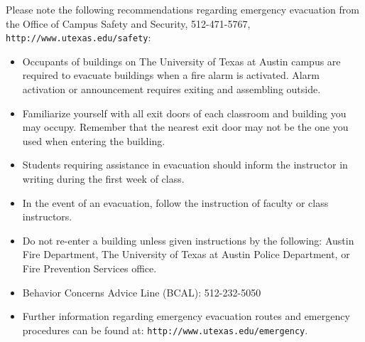 \documentclass[11pt]{article}
\begin{document}
Please note the following recommendations regarding emergency evacuation from the Office of Campus Safety and Security, 512-471-5767, \texttt{http://www.utexas.edu/safety}:
\begin{itemize}
\item Occupants of buildings on The University of Texas at Austin campus are required to evacuate buildings when a fire alarm is activated.  Alarm activation or announcement requires exiting and assembling outside.
\item Familiarize yourself with all exit doors of each classroom and building you may occupy.  Remember that the nearest exit door may not be the one you used when entering the building.
\item Students requiring assistance in evacuation should inform the instructor in writing during the first week of class.
\item In the event of an evacuation, follow the instruction of faculty or class instructors.
\item Do not re-enter a building unless given instructions by the following: Austin Fire Department, The University of Texas at Austin Police Department, or Fire Prevention Services office.
\item Behavior Concerns Advice Line (BCAL):  512-232-5050
\item Further information regarding emergency evacuation routes and emergency procedures can be found at: \texttt{http://www.utexas.edu/emergency}.
\end{itemize}
\end{document}
